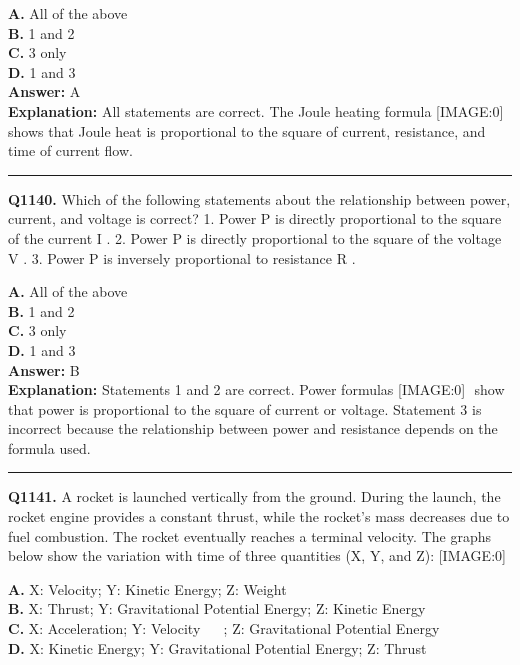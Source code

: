 \documentclass[12pt]{article}
\begin{document}
\textbf{A.} All of the above \\
\textbf{B.} 1 and 2 \\
\textbf{C.} 3 only \\
\textbf{D.} 1 and 3 \\

\textbf{Answer:} A \\
\textbf{Explanation:} All statements are correct. The Joule heating formula
[IMAGE:0]
shows that Joule heat is proportional to the square of current, resistance, and time of current flow.

\hrule
\vspace{1em}


\noindent
\textbf{Q1140.} Which of the following statements about the relationship between power, current, and voltage is correct?
1.
Power
P
is directly proportional to the square of the current
I
.
2.
Power
P
is directly proportional to the square of the voltage
V
.
3.
Power
P
is inversely proportional to resistance
R
.



\textbf{A.} All of the above \\
\textbf{B.} 1 and 2 \\
\textbf{C.} 3 only \\
\textbf{D.} 1 and 3 \\

\textbf{Answer:} B \\
\textbf{Explanation:} Statements 1 and 2 are correct. Power formulas
[IMAGE:0]
​
show that power is proportional to the square of current or voltage. Statement 3 is incorrect because the relationship between power and resistance depends on the formula used.

\hrule
\vspace{1em}


\noindent
\textbf{Q1141.} A rocket is launched vertically from the ground. During the launch, the rocket engine provides a constant thrust, while the rocket's mass decreases due to fuel combustion. The rocket eventually reaches a terminal velocity. The graphs below show the variation with time of three quantities (X, Y, and Z):
[IMAGE:0]



\textbf{A.} X: Velocity; Y: Kinetic Energy; Z: Weight \\
\textbf{B.} X: Thrust; Y: Gravitational Potential Energy; Z: Kinetic Energy \\
\textbf{C.} X: Acceleration; Y: Velocity    ; Z: Gravitational Potential Energy \\
\textbf{D.} X: Kinetic Energy; Y: Gravitational Potential Energy; Z: Thrust \\
\end{document}

